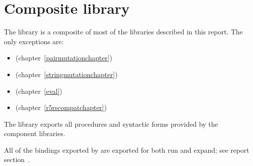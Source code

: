 \chapter{Composite library}
\label{complibchapter}

The  library is a composite of most of the libraries
described in this report.  The only exceptions are:
%
\begin{itemize}
\item {} (chapter~\ref{pairmutationchapter})
\item {} (chapter~\ref{stringmutationchapter})
\item {} (chapter~\ref{eval})
\item {} (chapter~\ref{r5rscompatchapter})
\end{itemize}
%
The library exports all procedures and syntactic forms provided by the
component libraries.

All of the bindings exported by \thersixlibrary{} are exported for both {\cf run}
and {\cf expand}; see report section~.

